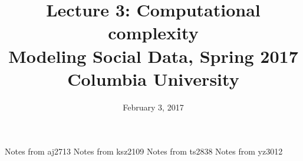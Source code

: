 \documentclass{article}
\title{
Lecture 3: Computational complexity \\  %
Modeling Social Data, Spring 2017 \\   %
Columbia University                    %
}
\date{February 3, 2017}                %
\makeatletter
\let\org@subfile
\renewcommand*{}[1]{%
  \filename@parse{#1}%
  \expandafter
  \graphicspath\expandafter{\expandafter{\filename@area}}%
  \org@subfile{#1}%
}
\makeatother
\begin{document}
\maketitle


\pagebreak \newpage \noindent\Huge{Notes from aj2713} \normalsize \setcounter{section}{0} 
\pagebreak \newpage \noindent\Huge{Notes from ksz2109} \normalsize \setcounter{section}{0} 
\pagebreak \newpage \noindent\Huge{Notes from ts2838} \normalsize \setcounter{section}{0} 
\pagebreak \newpage \noindent\Huge{Notes from yz3012} \normalsize \setcounter{section}{0} 
\end{document}
